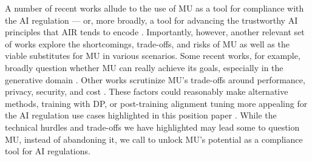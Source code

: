 A number of recent works allude to the use of MU as a tool for compliance with the AI regulation --- or, more broadly, a tool for advancing the trustworthy AI principles that AIR tends to encode \citep{hine_supporting_2024, DIAZRODRIGUEZ2023101896, li2024wmdpbenchmarkmeasuringreducing}. Importantly, however, another relevant set of works explore the shortcomings, trade-offs, and risks of MU as well as the viable substitutes for MU in various scenarios. Some recent works, for example, broadly question whether MU can really achieve its goals, especially in the generative domain \citep{cooper2024machineunlearningdoesntthink, barez2025openproblemsmachineunlearning,zhou2024limitationsprospectsmachineunlearning, shumailov2024ununlearningunlearningsufficientcontent}. Other works scrutinize MU's trade-offs around performance, privacy, security, and cost \citep{Xu_2024, carlini2022privacyonioneffectmemorization, Zhang_2023, keskpaik2024machine, zhou2024limitationsprospectsmachineunlearning, floridi2023machine}. 
These factors could reasonably make alternative methods, training with DP, or post-training alignment tuning more appealing for the AI regulation use cases highlighted in this position paper   \citet{lucki2024adversarialperspectivemachineunlearning, cooper2024machineunlearningdoesntthink}. While the technical hurdles and trade-offs we have highlighted may lead some to question MU, instead of abandoning it, we  call to unlock MU's potential as a compliance tool for AI regulations.
